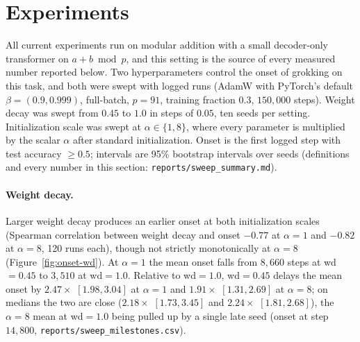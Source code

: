 \documentclass[11pt,a4paper]{article}
\begin{document}
\section{Experiments}
\label{sec:hess-experiments}

All current experiments run on modular addition with a small decoder-only
transformer on $a+b \bmod p$, and this setting is the source of every measured
number reported below. Two hyperparameters control the onset of grokking on this
task, and both were
swept with logged runs (AdamW with PyTorch's default $\beta = (0.9, 0.999)$, full-batch, $p=91$, training fraction $0.3$, $150{,}000$
steps). Weight decay was swept from $0.45$ to $1.0$ in steps of $0.05$, ten
seeds per setting. Initialization scale was swept at $\alpha \in \{1,8\}$, where
every parameter is multiplied by the scalar $\alpha$ after standard
initialization. Onset is the first logged step with test accuracy $\ge 0.5$;
intervals are 95\% bootstrap intervals over seeds (definitions and every number
in this section: \texttt{reports/sweep\_summary.md}).

\paragraph{Weight decay.} Larger weight decay produces an earlier onset at both
initialization scales (Spearman correlation between weight decay and onset $-0.77$
at $\alpha=1$ and $-0.82$ at $\alpha=8$, 120 runs each), though not strictly
monotonically at $\alpha=8$ (Figure~\ref{fig:onset-wd}). At $\alpha=1$ the mean
onset falls from $8{,}660$ steps at wd$=0.45$ to $3{,}510$ at wd$=1.0$. Relative
to wd$=1.0$, wd$=0.45$ delays the mean onset by $2.47\times$ $[1.98, 3.04]$ at
$\alpha=1$ and $1.91\times$ $[1.31, 2.69]$ at $\alpha=8$; on medians the two
are close ($2.18\times$ $[1.73, 3.45]$ and $2.24\times$ $[1.81, 2.68]$), the
$\alpha=8$ mean at wd$=1.0$ being pulled up by a single late seed (onset at step
$14{,}800$, \texttt{reports/sweep\_milestones.csv}).

\end{document}
